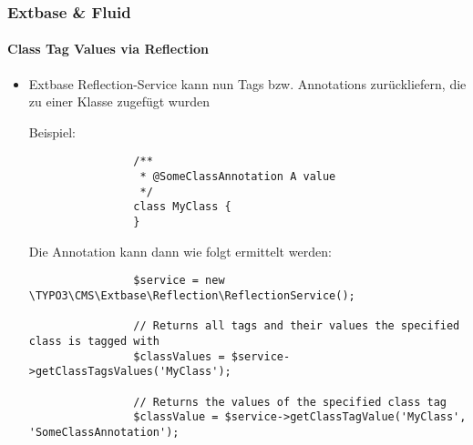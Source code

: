 \begin{frame}[fragile]
	\frametitle{Extbase \& Fluid}
	\framesubtitle{Class Tag Values via Reflection}

	\lstset{
		basicstyle=\tiny\ttfamily
	}

	\begin{itemize}
		\item Extbase Reflection-Service kann nun Tags bzw. Annotations zurückliefern,
			die zu einer Klasse zugefügt wurden\newline

			Beispiel:
			\begin{lstlisting}
				/**
				 * @SomeClassAnnotation A value
				 */
				class MyClass {
				}
			\end{lstlisting}

			Die Annotation kann dann wie folgt ermittelt werden:
			\begin{lstlisting}
				$service = new \TYPO3\CMS\Extbase\Reflection\ReflectionService();

				// Returns all tags and their values the specified class is tagged with
				$classValues = $service->getClassTagsValues('MyClass');

				// Returns the values of the specified class tag
				$classValue = $service->getClassTagValue('MyClass', 'SomeClassAnnotation');
			\end{lstlisting}

	\end{itemize}

\end{frame}

